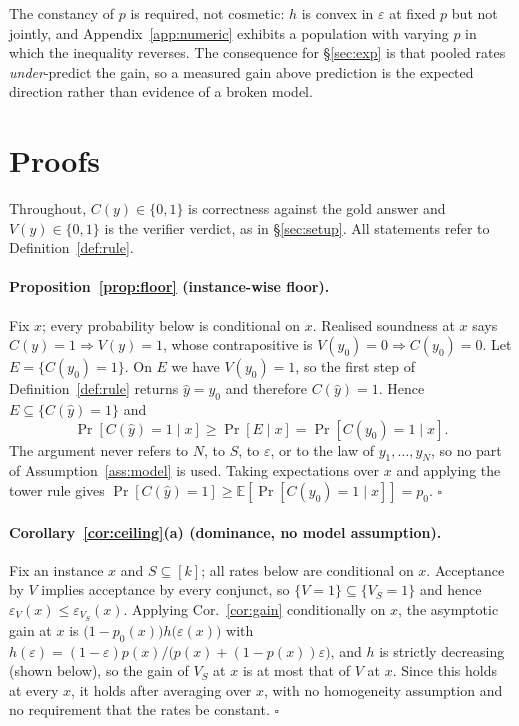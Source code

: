 \documentclass[11pt]{article}
\begin{document}
The constancy of $p$ is required, not cosmetic: $h$ is convex in $\varepsilon$
at fixed $p$ but not jointly, and Appendix~\ref{app:numeric} exhibits a
population with varying $p$ in which the inequality reverses. The consequence for
\S\ref{sec:exp} is that pooled rates \emph{under}-predict the gain, so a measured
gain above prediction is the expected direction rather than evidence of a broken
model.





\section{Proofs}\label{app:proofs}
Throughout, $C(y)\in\{0,1\}$ is correctness against the gold answer and $V(y)\in\{0,1\}$ is the verifier verdict, as in \S\ref{sec:setup}. All statements refer to Definition~\ref{def:rule}.

\paragraph{Proposition~\ref{prop:floor} (instance-wise floor).}
Fix $x$; every probability below is conditional on $x$. Realised soundness at $x$ says $C(y)=1\Rightarrow V(y)=1$, whose contrapositive is $V(y_0)=0\Rightarrow C(y_0)=0$. Let $E=\{C(y_0)=1\}$. On $E$ we have $V(y_0)=1$, so the first step of Definition~\ref{def:rule} returns $\hat y=y_0$ and therefore $C(\hat y)=1$. Hence $E\subseteq\{C(\hat y)=1\}$ and
\[\Pr[C(\hat y){=}1\mid x]\ge\Pr[E\mid x]=\Pr[C(y_0){=}1\mid x].\]
The argument never refers to $N$, to $S$, to $\varepsilon$, or to the law of $y_1,\dots,y_N$, so no part of Assumption~\ref{ass:model} is used. Taking expectations over $x$ and applying the tower rule gives $\Pr[C(\hat y)=1]\ge\mathbb{E}[\Pr[C(y_0)=1\mid x]]=p_0$. \hfill$\square$

\paragraph{Corollary~\ref{cor:ceiling}(a) (dominance, no model assumption).}
Fix an instance $x$ and $S\subseteq[k]$; all rates below are conditional on $x$.
Acceptance by $V$ implies acceptance by every conjunct, so
$\{V{=}1\}\subseteq\{V_S{=}1\}$ and hence
$\varepsilon_V(x)\le\varepsilon_{V_S}(x)$. Applying Cor.~\ref{cor:gain}
conditionally on $x$, the asymptotic gain at $x$ is
$\bigl(1-p_0(x)\bigr)h\bigl(\varepsilon(x)\bigr)$ with
$h(\varepsilon)=(1-\varepsilon)p(x)/\bigl(p(x)+(1-p(x))\varepsilon\bigr)$, and
$h$ is strictly decreasing (shown below), so the gain of $V_S$ at $x$ is at most
that of $V$ at $x$. Since this holds at every $x$, it holds after averaging over
$x$, with no homogeneity assumption and no requirement that the rates be
constant. \hfill$\square$
\end{document}
